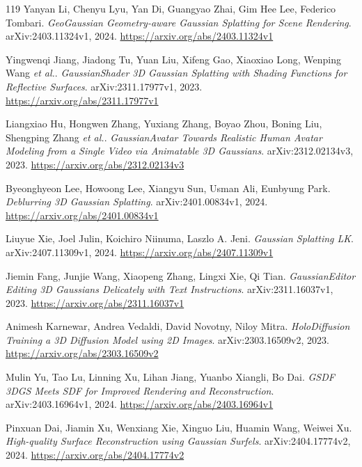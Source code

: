 \documentclass[11pt,a4paper]{article}
\begin{document}
\begin{thebibliography}{119}
Yanyan Li, Chenyu Lyu, Yan Di, Guangyao Zhai, Gim Hee Lee, Federico Tombari.
\newblock \emph{GeoGaussian Geometry-aware Gaussian Splatting for Scene Rendering}.
\newblock arXiv:2403.11324v1, 2024.
\newblock \url{https://arxiv.org/abs/2403.11324v1}

Yingwenqi Jiang, Jiadong Tu, Yuan Liu, Xifeng Gao, Xiaoxiao Long, Wenping Wang \emph{et al.}.
\newblock \emph{GaussianShader 3D Gaussian Splatting with Shading Functions for Reflective Surfaces}.
\newblock arXiv:2311.17977v1, 2023.
\newblock \url{https://arxiv.org/abs/2311.17977v1}

Liangxiao Hu, Hongwen Zhang, Yuxiang Zhang, Boyao Zhou, Boning Liu, Shengping Zhang \emph{et al.}.
\newblock \emph{GaussianAvatar Towards Realistic Human Avatar Modeling from a Single Video via Animatable 3D Gaussians}.
\newblock arXiv:2312.02134v3, 2023.
\newblock \url{https://arxiv.org/abs/2312.02134v3}

Byeonghyeon Lee, Howoong Lee, Xiangyu Sun, Usman Ali, Eunbyung Park.
\newblock \emph{Deblurring 3D Gaussian Splatting}.
\newblock arXiv:2401.00834v1, 2024.
\newblock \url{https://arxiv.org/abs/2401.00834v1}

Liuyue Xie, Joel Julin, Koichiro Niinuma, Laszlo A. Jeni.
\newblock \emph{Gaussian Splatting LK}.
\newblock arXiv:2407.11309v1, 2024.
\newblock \url{https://arxiv.org/abs/2407.11309v1}

Jiemin Fang, Junjie Wang, Xiaopeng Zhang, Lingxi Xie, Qi Tian.
\newblock \emph{GaussianEditor Editing 3D Gaussians Delicately with Text Instructions}.
\newblock arXiv:2311.16037v1, 2023.
\newblock \url{https://arxiv.org/abs/2311.16037v1}

Animesh Karnewar, Andrea Vedaldi, David Novotny, Niloy Mitra.
\newblock \emph{HoloDiffusion Training a 3D Diffusion Model using 2D Images}.
\newblock arXiv:2303.16509v2, 2023.
\newblock \url{https://arxiv.org/abs/2303.16509v2}

Mulin Yu, Tao Lu, Linning Xu, Lihan Jiang, Yuanbo Xiangli, Bo Dai.
\newblock \emph{GSDF 3DGS Meets SDF for Improved Rendering and Reconstruction}.
\newblock arXiv:2403.16964v1, 2024.
\newblock \url{https://arxiv.org/abs/2403.16964v1}

Pinxuan Dai, Jiamin Xu, Wenxiang Xie, Xinguo Liu, Huamin Wang, Weiwei Xu.
\newblock \emph{High-quality Surface Reconstruction using Gaussian Surfels}.
\newblock arXiv:2404.17774v2, 2024.
\newblock \url{https://arxiv.org/abs/2404.17774v2}


\end{thebibliography}
\end{document}
